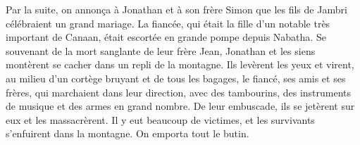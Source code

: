 Par la suite, on annonça à Jonathan et à son frère Simon
		que les fils de Jambri célébraient un grand mariage.
La fiancée, qui était la fille d’un notable très important de Canaan,
	était escortée en grande pompe depuis Nabatha.
Se souvenant de la mort sanglante de leur frère Jean,
	Jonathan et les siens montèrent se cacher dans un repli de la montagne.
Ils levèrent les yeux et virent, au milieu d’un cortège bruyant et de tous les bagages,
	le fiancé, ses amis et ses frères, qui marchaient dans leur direction,
	avec des tambourins, des instruments de musique et des armes en grand nombre.
De leur embuscade, ils se jetèrent sur eux et les massacrèrent.
	Il y eut beaucoup de victimes, et les survivants s’enfuirent dans la montagne.
	On emporta tout le butin.
